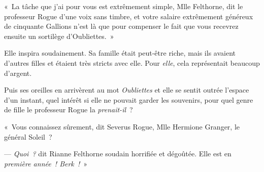 «~La tâche que j'ai pour vous est extrêmement simple, Mlle Felthorne, dit le professeur Rogue d'une voix sans timbre, et votre salaire extrêmement généreux de cinquante Gallions n'est là que pour compenser le fait que vous recevrez ensuite un sortilège d'Oubliettes.~»

Elle inspira soudainement.
Sa famille était peut-être riche, mais ils avaient d'autres filles et étaient très stricts avec elle.
Pour \emph{elle}, cela représentait beaucoup d'argent.

Puis ses oreilles en arrivèrent au mot \emph{Oubliettes} et elle se sentit outrée l'espace d'un instant, quel intérêt si elle ne pouvait garder les souvenirs, pour quel genre de fille le professeur Rogue la \emph{prenait-il}~?

«~Vous connaissez sûrement, dit Severus Rogue, Mlle Hermione Granger, le général Soleil~?

--- \emph{Quoi~?} dit Rianne Felthorne soudain horrifiée et dégoûtée.
Elle est en \emph{première année~!
Berk~!}~»
